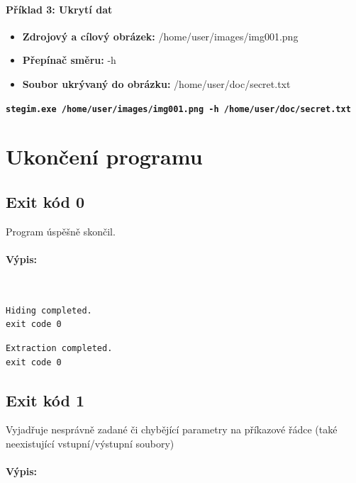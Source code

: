 \documentclass[12pt]{report}
\begin{document}
    \paragraph{Příklad 3: Ukrytí dat}
    \begin{itemize}
        \item \textbf{Zdrojový a cílový obrázek:} /home/user/images/img001.png
        \item \textbf{Přepínač směru:} -h
        \item \textbf{Soubor ukrývaný do obrázku:} /home/user/doc/secret.txt
    \end{itemize}
\texttt{\textbf{stegim.exe /home/user/images/img001.png -h /home/user/doc/secret.txt}}

    \section{Ukončení programu}

    \subsection{Exit kód 0}
    Program úspěšně skončil.

    \paragraph{Výpis:}\\
    \begin{mdframed}
        \begin{verbatim}
Hiding completed.
exit code 0
        \end{verbatim}
    \end{mdframed}

    \begin{mdframed}
        \begin{verbatim}
Extraction completed.
exit code 0
        \end{verbatim}
    \end{mdframed}

    \subsection{Exit kód 1}
    Vyjadřuje nesprávně zadané či chybějící parametry na příkazové řádce (také
    neexistující vstupní/výstupní soubory)\\

    \paragraph{Výpis:}\\
\end{document}
